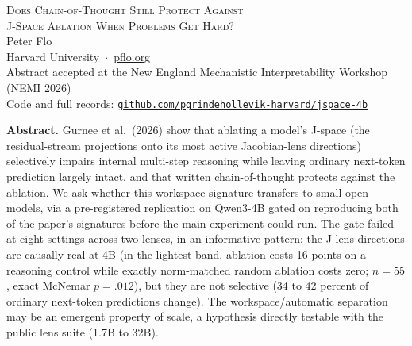 \documentclass[11pt]{article}
\begin{document}
\begin{center}
{\LARGE\scshape Does Chain-of-Thought Still Protect Against\\[3pt] J-Space Ablation When Problems Get Hard?}\\[14pt]
{\large Peter Flo}\\[3pt]
{\small Harvard University \,$\cdot$\, \href{https://pflo.org}{pflo.org}}\\[4pt]
{\small Abstract accepted at the New England Mechanistic Interpretability Workshop (NEMI 2026)}\\[6pt]
{\small Code and full records: \href{https://github.com/pgrindehollevik-harvard/jspace-4b}{\texttt{github.com/pgrindehollevik-harvard/jspace-4b}}}
\end{center}

\vspace{4pt}
\begin{center}
\begin{minipage}{0.92\linewidth}
\small
\textbf{Abstract.} Gurnee et al.\ (2026) show that ablating a model's J-space (the residual-stream
projections onto its most active Jacobian-lens directions) selectively impairs internal multi-step
reasoning while leaving ordinary next-token prediction largely intact, and that written
chain-of-thought protects against the ablation. We ask whether this workspace signature transfers
to small open models, via a pre-registered replication on Qwen3-4B gated on reproducing both of the
paper's signatures before the main experiment could run. The gate failed at eight settings across
two lenses, in an informative pattern: the J-lens directions are causally real at 4B (in the
lightest band, ablation costs 16 points on a reasoning control while exactly norm-matched random
ablation costs zero; $n{=}55$, exact McNemar $p{=}.012$), but they are not selective (34 to 42
percent of ordinary next-token predictions change). The workspace/automatic separation may be an
emergent property of scale, a hypothesis directly testable with the public lens suite (1.7B to 32B).
\end{minipage}
\end{center}
\vspace{6pt}
\end{document}

